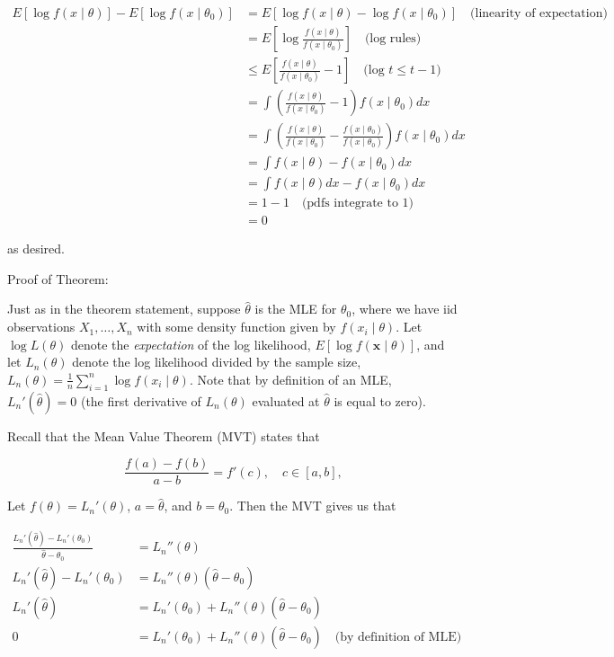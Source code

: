 \documentclass[
  letterpaper,
  DIV=11,
  numbers=noendperiod]{scrreprt}
\begin{document}
\begin{align*}
    E[\log f(x \mid \theta)] - E[\log f(x \mid \theta_0)] & = E[\log f(x \mid \theta) - \log f(x \mid \theta_0)] \quad \text{(linearity of expectation)} \\
    & = E\left[ \log \frac{ f(x \mid \theta)}{f(x \mid \theta_0)} \right] \quad \text{(log rules)} \\
    & \leq E\left[ \frac{ f(x \mid \theta)}{f(x \mid \theta_0)} - 1 \right] \quad \text{(log $t \leq t - 1$)} \\
    & = \int \left( \frac{ f(x \mid \theta)}{f(x \mid \theta_0)} - 1 \right)  f(x \mid \theta_0) dx \\
    & = \int \left( \frac{ f(x \mid \theta)}{f(x \mid \theta_0)} - \frac{ f(x \mid \theta_0)}{f(x \mid \theta_0)} \right)  f(x \mid \theta_0) dx \\
    & = \int f(x \mid \theta) - f(x \mid \theta_0) dx \\
    & = \int f(x \mid \theta) dx - f(x \mid \theta_0) dx \\
    & = 1 - 1 \quad \text{(pdfs integrate to 1)} \\
    & = 0
\end{align*}

as desired.

Proof of Theorem:

Just as in the theorem statement, suppose \(\hat{\theta}\) is the MLE
for \(\theta_0\), where we have iid observations \(X_1, \dots, X_n\)
with some density function given by \(f(x_i \mid \theta)\). Let
\(\log L(\theta)\) denote the \textit{expectation} of the log
likelihood, \(E[\log f(\textbf{x} \mid \theta)]\), and let
\(L_n(\theta)\) denote the log likelihood divided by the sample size,
\(L_n(\theta) = \frac{1}{n}\sum_{i = 1}^n \log f(x_i \mid \theta)\).
Note that by definition of an MLE, \(L_n'(\hat{\theta}) = 0\) (the first
derivative of \(L_n(\theta)\) evaluated at \(\hat{\theta}\) is equal to
zero).

Recall that the Mean Value Theorem (MVT) states that

\[
\frac{f(a) - f(b)}{a - b} = f'(c), \quad c \in [a,b],
\]

Let \(f(\theta) = L_n'(\theta)\), \(a = \hat{\theta}\), and
\(b = \theta_0\). Then the MVT gives us that

\begin{align*}
    \frac{L_n'(\hat{\theta}) - L_n'(\theta_0)}{\hat{\theta} - \theta_0} &= L_n''(\theta) \\
    L_n'(\hat{\theta}) - L_n'(\theta_0) & = L_n''(\theta) (\hat{\theta} - \theta_0) \\
     L_n'(\hat{\theta}) & = L_n'(\theta_0) + L_n''(\theta) (\hat{\theta} - \theta_0) \\
    0 & = L_n'(\theta_0) + L_n''(\theta) (\hat{\theta} - \theta_0) \quad \text{(by definition of MLE)}
\end{align*}
\end{document}
